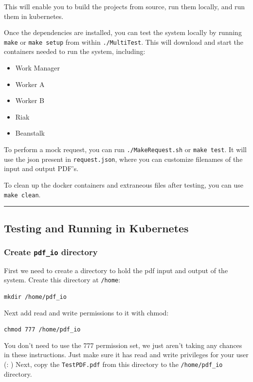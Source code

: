 \documentclass[onecolumn, draftclsnofoot,10pt, compsoc]{IEEEtran}
\begin{document}
This will enable you to build the projects from source, run them
locally, and run them in kubernetes.

Once the dependencies are installed, you can test the system locally by
running \texttt{make} or \texttt{make\ setup} from within
\texttt{./MultiTest}. This will download and start the containers needed
to run the system, including:

\begin{itemize}
\item
  Work Manager
\item
  Worker A
\item
  Worker B
\item
  Riak
\item
  Beanstalk
\end{itemize}

To perform a mock request, you can run \texttt{./MakeRequest.sh} or
\texttt{make\ test}. It will use the json present in
\texttt{request.json}, where you can customize filenames of the input
and output PDF's.

To clean up the docker containers and extraneous files after testing,
you can use \texttt{make\ clean}.

\begin{center}\rule{0.5\linewidth}{\linethickness}\end{center}


\subsection{Testing and Running in Kubernetes}\label{testing-and-running-in-kubernetes}

\subsubsection*{Create \texttt{pdf\_io} directory}

First we need to create a directory to hold the pdf input and output of
the system. Create this directory at \texttt{/home}:

\texttt{mkdir\ /home/pdf\_io}

Next add read and write permissions to it with chmod:

\texttt{chmod\ 777\ /home/pdf\_io}

You don't need to use the 777 permission set, we just aren't taking any
chances in these instructions. Just make sure it has read and write
privileges for your user (: ) Next, copy the \texttt{TestPDF.pdf} from
this directory to the \texttt{/home/pdf\_io} directory.
\end{document}
